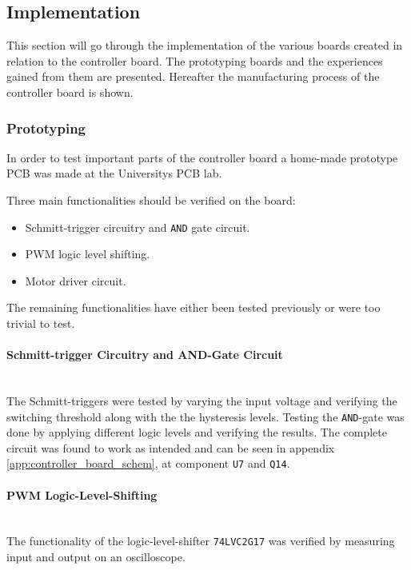 \subsection{Implementation} %
\label{sub:controller_implementation}
This section will go through the implementation of the various boards created in relation to the controller board.
The prototyping boards and the experiences gained from them are presented.
Hereafter the manufacturing process of the controller board is shown.

\subsubsection{Prototyping}
\label{sub:controller_board_prototyping}
In order to test important parts of the controller board a home-made prototype PCB was made at the Universitys PCB lab.

Three main functionalities should be verified on the board:

\begin{itemize}
	\item Schmitt-trigger circuitry and \texttt{AND} gate circuit.
	\item PWM logic level shifting.
	\item Motor driver circuit.
\end{itemize}

The remaining functionalities have either been tested previously or were too trivial to test. 

\paragraph{Schmitt-trigger Circuitry and AND-Gate Circuit}~\\
The Schmitt-triggers were tested by varying the input voltage and verifying the switching threshold along with the the hysteresis levels. 
Testing the \texttt{AND}-gate was done by applying different logic levels and verifying the results.
The complete circuit was found to work as intended and can be seen in appendix \ref{app:controller_board_schem}, at component \texttt{U7} and \texttt{Q14}.

\paragraph{PWM Logic-Level-Shifting}~\\
The functionality of the logic-level-shifter \texttt{74LVC2G17} was verified by measuring input and output on an oscilloscope. 

